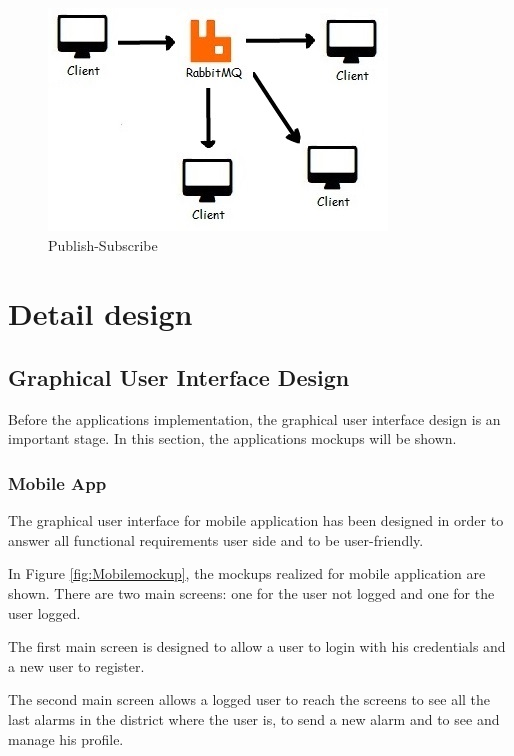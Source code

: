 \documentclass[a4paper,12pt]{report}
\begin{document}
\begin{figure}[ht]
\centering
\includegraphics{figures/ps.jpg}
\caption{Publish-Subscribe}
\label{fig:PS}
\end{figure}

\chapter{Detail design}

\section{Graphical User Interface Design}

Before the applications implementation, the graphical user interface design is an important stage. In this section, the applications mockups will be shown.

\subsection{Mobile App}

The graphical user interface for mobile application has been designed in order to answer all functional requirements user side and to be user-friendly.

In Figure \ref{fig:Mobilemockup}, the mockups realized for mobile application are shown. There are two main screens: one for the user not logged and one for the user logged.

The first main screen is designed to allow a user to login with his credentials and a new user to register.

The second main screen allows a logged user to reach the screens to see all the last alarms in the district where the user is, to send a new alarm and to see and manage his profile.
\end{document}
